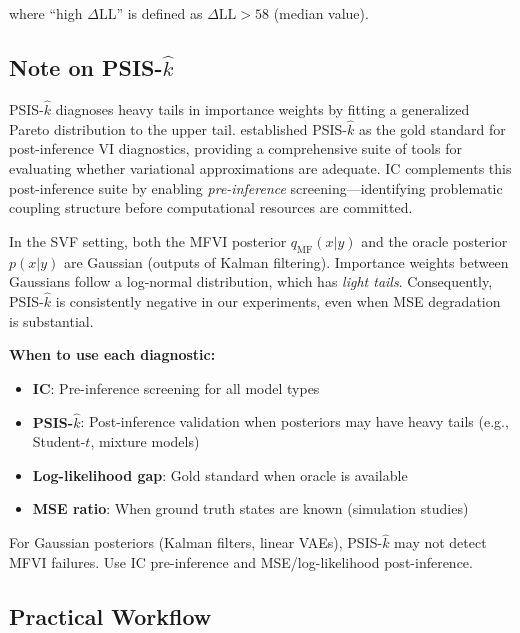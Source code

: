 \documentclass[10pt]{article} %
\theoremstyle{plain}
\theoremstyle{definition}
\begin{document}
\noindent where ``high $\Delta$LL'' is defined as $\Delta\text{LL} > 58$ (median value).

\subsection{Note on PSIS-$\hat{k}$}
\label{sec:psis-note}

PSIS-$\hat{k}$ \citep{vehtari2017practical, yao2018yes} diagnoses heavy tails in importance weights by fitting a generalized Pareto distribution to the upper tail. \citet{yao2018yes} established PSIS-$\hat{k}$ as the gold standard for post-inference VI diagnostics, providing a comprehensive suite of tools for evaluating whether variational approximations are adequate. IC complements this post-inference suite by enabling \emph{pre-inference} screening---identifying problematic coupling structure before computational resources are committed.

In the SVF setting, both the MFVI posterior $q_{\text{MF}}(x|y)$ and the oracle posterior $p(x|y)$ are Gaussian (outputs of Kalman filtering). Importance weights between Gaussians follow a log-normal distribution, which has \emph{light tails}. Consequently, PSIS-$\hat{k}$ is consistently negative in our experiments, even when MSE degradation is substantial.

\begin{tcolorbox}[colback=yellow!5!white, colframe=yellow!50!black, title=Diagnostic Selection Guide]
\textbf{When to use each diagnostic:}
\begin{itemize}[nosep]
    \item \textbf{IC}: Pre-inference screening for all model types
    \item \textbf{PSIS-$\hat{k}$}: Post-inference validation when posteriors may have heavy tails (e.g., Student-$t$, mixture models)
    \item \textbf{Log-likelihood gap}: Gold standard when oracle is available
    \item \textbf{MSE ratio}: When ground truth states are known (simulation studies)
\end{itemize}
For Gaussian posteriors (Kalman filters, linear VAEs), PSIS-$\hat{k}$ may not detect MFVI failures. Use IC pre-inference and MSE/log-likelihood post-inference.
\end{tcolorbox}

\subsection{Practical Workflow}
\end{document}
